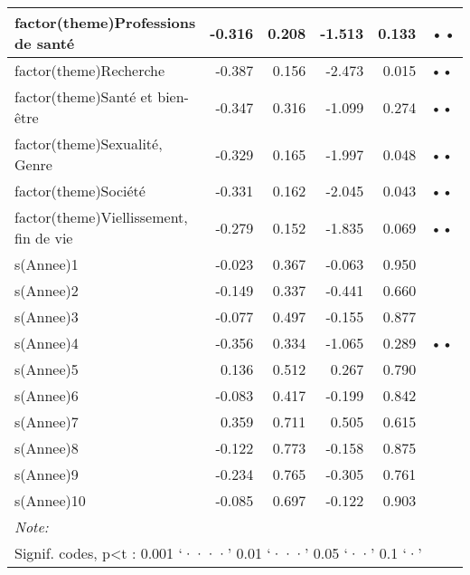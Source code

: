 \documentclass[
  letterpaper,
  DIV=11,
  numbers=noendperiod]{scrartcl}
\begin{document}
\begin{table}
\begin{minipage}[t]{\linewidth}
{\begin{tabular}[t]{l|r|r|r|r|l}
\hline
factor(theme)Professions de santé & -0.316 & 0.208 & -1.513 & 0.133 & ••\\
\hline
factor(theme)Recherche & -0.387 & 0.156 & -2.473 & 0.015 & ••\\
\hline
factor(theme)Santé et bien-être & -0.347 & 0.316 & -1.099 & 0.274 & ••\\
\hline
factor(theme)Sexualité, Genre & -0.329 & 0.165 & -1.997 & 0.048 & ••\\
\hline
factor(theme)Société & -0.331 & 0.162 & -2.045 & 0.043 & ••\\
\hline
factor(theme)Viellissement, fin de vie & -0.279 & 0.152 & -1.835 & 0.069 & ••\\
\hline
s(Annee)1 & -0.023 & 0.367 & -0.063 & 0.950 & \\
\hline
s(Annee)2 & -0.149 & 0.337 & -0.441 & 0.660 & \\
\hline
s(Annee)3 & -0.077 & 0.497 & -0.155 & 0.877 & \\
\hline
s(Annee)4 & -0.356 & 0.334 & -1.065 & 0.289 & ••\\
\hline
s(Annee)5 & 0.136 & 0.512 & 0.267 & 0.790 & \\
\hline
s(Annee)6 & -0.083 & 0.417 & -0.199 & 0.842 & \\
\hline
s(Annee)7 & 0.359 & 0.711 & 0.505 & 0.615 & \\
\hline
s(Annee)8 & -0.122 & 0.773 & -0.158 & 0.875 & \\
\hline
s(Annee)9 & -0.234 & 0.765 & -0.305 & 0.761 & \\
\hline
s(Annee)10 & -0.085 & 0.697 & -0.122 & 0.903 & \\
\hline
\multicolumn{6}{l}{\rule{0pt}{1em}\textit{Note: }}\\
\multicolumn{6}{l}{\rule{0pt}{1em}Signif. codes, p<t : 0.001 ‘····’ 0.01 ‘···’ 0.05 ‘··’ 0.1 ‘·’ }\\
\end{tabular}

}

\end{minipage}%
\newline
\begin{minipage}[t]{\linewidth}

{\centering 

}
\end{minipage}
\end{table}
\end{document}
